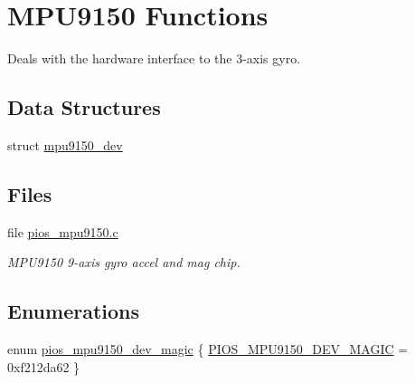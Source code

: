 \hypertarget{group___p_i_o_s___m_p_u9150}{\section{\-M\-P\-U9150 \-Functions}
\label{group___p_i_o_s___m_p_u9150}
}


\-Deals with the hardware interface to the 3-\/axis gyro.  


\subsection*{\-Data \-Structures}
\begin{DoxyCompactItemize}
\item 
struct \hyperlink{structmpu9150__dev}{mpu9150\-\_\-dev}
\end{DoxyCompactItemize}
\subsection*{\-Files}
\begin{DoxyCompactItemize}
\item 
file \hyperlink{pios__mpu9150_8c}{pios\-\_\-mpu9150.\-c}
\begin{DoxyCompactList}\small\item\em \-M\-P\-U9150 9-\/axis gyro accel and mag chip. \end{DoxyCompactList}\end{DoxyCompactItemize}
\subsection*{\-Enumerations}
\begin{DoxyCompactItemize}
\item 
enum \hyperlink{group___p_i_o_s___m_p_u9150_ga2924f0a0ab14681967b9e7f1e72e1c46}{pios\-\_\-mpu9150\-\_\-dev\-\_\-magic} \{ \hyperlink{group___p_i_o_s___m_p_u9150_gga2924f0a0ab14681967b9e7f1e72e1c46a111e3179bf78fadce5ff0039f2f78190}{\-P\-I\-O\-S\-\_\-\-M\-P\-U9150\-\_\-\-D\-E\-V\-\_\-\-M\-A\-G\-I\-C} =  0xf212da62
 \}
\end{DoxyCompactItemize}
